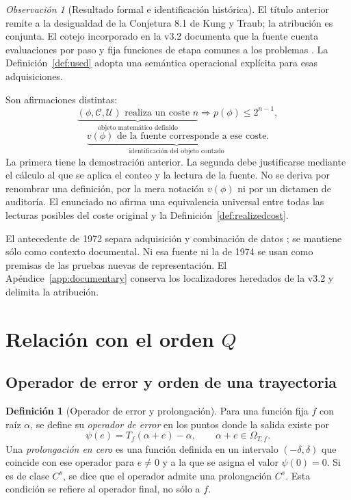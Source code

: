 \documentclass[11pt,a4paper]{article}
\numberwithin{equation}{section}
\theoremstyle{definition}
\newtheorem{definition}[theorem]{Definición}
\theoremstyle{remark}
\newtheorem{remark}[theorem]{Observación}
\begin{document}
\begin{remark}[Resultado formal e identificación histórica]\label{rem:historical}
El título anterior remite a la desigualdad de la Conjetura 8.1 de Kung y Traub; la atribución es conjunta. El cotejo incorporado en la v3.2 documenta que la fuente cuenta evaluaciones por paso y fija funciones de etapa comunes a los problemas \cite[pp.~644--645, 649]{KT1974}. La Definición~\ref{def:used} adopta una semántica operacional explícita para esas adquisiciones.

Son afirmaciones distintas:
\[
\underbrace{(\phi,\mathscr C,\mathcal U)\text{ realiza un coste }n}_{\text{objeto matemático definido}}
\Longrightarrow p(\phi)\le2^{n-1},
\]
\[
\underbrace{v(\phi)\text{ de la fuente corresponde a ese coste}}_{\text{identificación del objeto contado}}.
\]
La primera tiene la demostración anterior. La segunda debe justificarse mediante el cálculo al que se aplica el conteo y la lectura de la fuente. No se deriva por renombrar una definición, por la mera notación $v(\phi)$ ni por un dictamen de auditoría. El enunciado no afirma una equivalencia universal entre todas las lecturas posibles del coste original y la Definición~\ref{def:realizedcost}.

El antecedente de 1972 separa adquisición y combinación de datos \cite[pp.~168--169]{Traub1972}; se mantiene sólo como contexto documental. Ni esa fuente ni la de 1974 se usan como premisas de las pruebas nuevas de representación. El Apéndice~\ref{app:documentary} conserva los localizadores heredados de la v3.2 y delimita la atribución.
\end{remark}

\clearpage
\section{Relación con el orden \texorpdfstring{$Q$}{Q}}\label{sec:Q}

\subsection{Operador de error y orden de una trayectoria}
\begin{definition}[Operador de error y prolongación]\label{def:errorop}
Para una función fija $f$ con raíz $\alpha$, se define su \emph{operador de error} en los puntos donde la salida existe por
\[
\psi(e)=T_f(\alpha+e)-\alpha,\qquad
\alpha+e\in\Omega_{T,f}.
\]
Una \emph{prolongación en cero} es una función definida en un intervalo $(-\delta,\delta)$ que coincide con ese operador para $e\ne0$ y a la que se asigna el valor $\psi(0)=0$. Si es de clase $C^s$, se dice que el operador admite una prolongación $C^s$. Esta condición se refiere al operador final, no sólo a $f$.
\end{definition}
\end{document}

